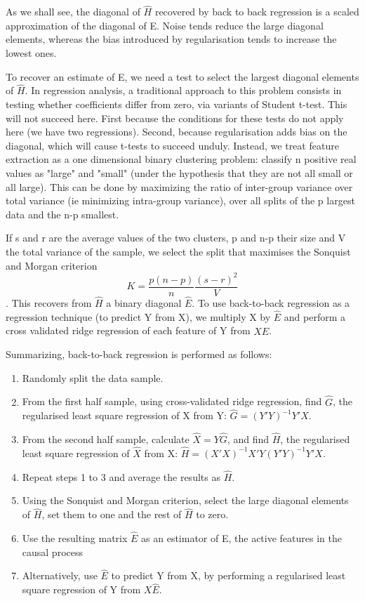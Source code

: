 \documentclass{article}
\begin{document}
As we shall see, the diagonal of $\hat H$ recovered by back to back regression is a scaled approximation of the diagonal of E. Noise tends reduce the large diagonal elements, whereas the bias introduced by regularisation tends to increase the lowest ones.

To recover an estimate of E, we need a test to select the largest diagonal elements of $\hat H$.
%
In regression analysis, a traditional approach to this problem consists in testing whether coefficients differ from zero, via variants of Student t-test.
%
This will not succeed here. First because the conditions for these tests do not apply here (we have two regressions). Second, because regularisation adds bias on the diagonal, which will cause t-tests to succeed unduly.
%
Instead, we treat feature extraction as a one dimensional binary clustering problem: classify n positive real values as "large" and "small" (under the hypothesis that they are not all small or all large). This can be done by maximizing the ratio of inter-group variance over total variance (ie minimizing intra-group variance), over all splits of the p largest data and the n-p smallest. 

If s and r are the average values of the two clusters, p and n-p their size and V the total variance of the sample, we select the split that maximises the Sonquist and Morgan criterion $$K = \frac{p (n-p)}{n} \frac{(s-r)^2}{ V}$$.
%
This recovers from $\hat H$ a binary diagonal $\hat E$.
%
To use back-to-back regression as a regression technique (to predict Y from X), we multiply X by $\hat E$ and perform a cross validated ridge regression of each feature of Y from $X \hat E $.

Summarizing, back-to-back regression is performed as follows:
\begin{enumerate}
\item Randomly split the data sample.
\item From the first half sample, using cross-validated ridge regression, find $\hat G$, the regularised least square regression of X from Y: $\hat G=(Y'Y)^{-1} Y'X$.
\item From the second half sample, calculate $\hat X = Y \hat G$, and find $\hat H$, the regularised least square regression of $\hat X$ from X: $\hat H=(X'X)^{-1} X'Y(Y'Y)^{-1} Y'X$.
\item Repeat steps 1 to 3 and average the results as $\hat H$.
\item Using the Sonquist and Morgan criterion, select the large diagonal elements of $\hat H$, set them to one and the rest of $\hat  H$ to zero.
\item Use the resulting matrix $\hat E$ as an estimator of E, the active features in the causal process
\item Alternatively, use $\hat E$ to predict Y from X, by performing a regularised least square regression of Y from $X \hat E$.
%

\end{enumerate}
\end{document}
